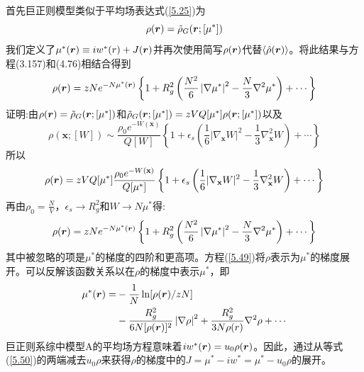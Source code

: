 首先巨正则模型类似于平均场表达式(\ref{5.25})为
\begin{equation}
\rho(\bm{r})=\tilde{\rho}_G(\bm{r};[\mu^*])
\end{equation}
我们定义了$\mu^*(\bm{r})\equiv iw^*(r)+J(\bm{r})$并再次使用简写$\rho(\bm{r})$代替$\left\langle\hat{\rho}(\bm{r})\right\rangle$。将此结果与方程(3.157)和(4.76)相结合得到
\begin{equation}\label{5.49}
\rho(\bm{r})=zNe^{-N\mu^*(\bm{r})}\left\{1+R_g^2\left(\frac{N^2}{6}\left|\nabla\mu^*\right|^2-\frac{N}{3}\nabla^2\mu^*\right)+\cdots\right\}
\end{equation}
证明:由$\rho(\bm{r})=\tilde{\rho}_G(\bm{r};[\mu^*])$和$\tilde{\rho}_G(\bm{r};[\mu^*])=zVQ[\mu^*]\rho(\bm{r};[\mu^*])$以及
\begin{equation*}
\rho(\mathbf{x};[W])\sim\frac{\rho_0e^{-W(\mathbf{x})}}{Q[W]}\left\{1+\epsilon_s\left(\frac{1}{6}|\nabla_{\mathbf{x}}W|^2-\frac{1}{3}\nabla_{\mathbf{x}}^2W\right)+\cdots\right\}
\end{equation*}
所以
\begin{equation*}
\rho(\bm{r})=zVQ[\mu^*]\frac{\rho_0e^{-W(\mathbf{x})}}{Q[\mu^*]}\left\{1+\epsilon_s\left(\frac{1}{6}|\nabla_{\mathbf{x}}W|^2-\frac{1}{3}\nabla_{\mathbf{x}}^2W\right)+\cdots\right\}
\end{equation*}
再由$\rho_0=\frac{N}{V}$，$\epsilon_s\rightarrow R_g^2$和$W\rightarrow N\mu^*$得:
\begin{equation*}
\rho(\bm{r})=zNe^{-N\mu^*(\bm{r})}\left\{1+R_g^2\left(\frac{N^2}{6}\left|\nabla\mu^*\right|^2-\frac{N}{3}\nabla^2\mu^*\right)+\cdots\right\}
\end{equation*}
其中被忽略的项是$\mu^*$的梯度的四阶和更高项。方程(\ref{5.49})将$\rho$表示为$\mu^*$的梯度展开。可以反解该函数关系以在$\rho$的梯度中表示$\mu^*$，即
\begin{equation}\label{5.50}
\begin{aligned}
\mu^*(\bm{r})=&-\frac{1}{N}\ln[\rho(\bm{r})/zN]\\
&-\frac{R_g^2}{6N[\rho(\bm{r})]^2}\left|\nabla\rho\right|^2+\frac{R_g^2}{3N\rho(r)}\nabla^2\rho+\cdots
\end{aligned}
\end{equation}
巨正则系综中模型A的平均场方程意味着$iw^*(\bm{r})=u_0\rho(\bm{r})$。因此，通过从等式(\ref{5.50})的两端减去$u_0\rho$来获得$\rho$的梯度中的$J=\mu^*-iw^*=\mu^*-u_0\rho$的展开。

